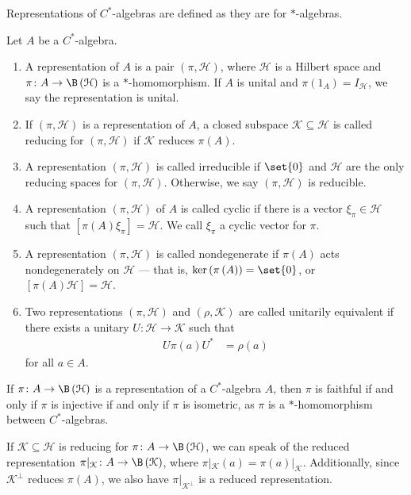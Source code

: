 \documentclass[10pt]{mypackage}
\begin{document}
Representations of $C^{\ast}$-algebras are defined as they are for $\ast$-algebras.
\begin{definition}
  Let $A$ be a $C^{\ast}$-algebra.
  \begin{enumerate}[(1)]
    \item A representation of $A$ is a pair $\left(\pi,\mathcal{H}\right)$, where $\mathcal{H}$ is a Hilbert space and $\pi\colon A\rightarrow \B\left(\mathcal{H}\right)$ is a $\ast$-homomorphism. If $A$ is unital and $\pi\left(1_A\right) = I_{\mathcal{H}}$, we say the representation is unital.
    \item If $\left(\pi,\mathcal{H}\right)$ is a representation of $A$, a closed subspace $\mathcal{K}\subseteq \mathcal{H}$ is called reducing for $\left(\pi,\mathcal{H}\right)$ if $\mathcal{K}$ reduces $\pi(A)$.
    \item A representation $\left(\pi,\mathcal{H}\right)$ is called irreducible if $\set{0}$ and $\mathcal{H}$ are the only reducing spaces for $\left(\pi,\mathcal{H}\right)$. Otherwise, we say $\left(\pi,\mathcal{H}\right)$ is reducible.
    \item A representation $\left(\pi,\mathcal{H}\right)$ of $A$ is called cyclic if there is a vector $\xi_{\pi}\in \mathcal{H}$ such that $\left[\pi(A)\xi_{\pi}\right] = \mathcal{H}$. We call $\xi_{\pi}$ a cyclic vector for $\pi$.
    \item A representation $\left(\pi,\mathcal{H}\right)$ is called nondegenerate if $\pi(A)$ acts nondegenerately on $\mathcal{H}$ --- that is, $\ker\left(\pi\left(A\right)\right) = \set{0}$, or $\left[\pi(A)\mathcal{H}\right] = \mathcal{H}$.
    \item Two representations $\left(\pi,\mathcal{H}\right)$ and $\left(\rho,\mathcal{K}\right)$ are called unitarily equivalent if there exists a unitary $U\colon \mathcal{H}\rightarrow \mathcal{K}$ such that
      \begin{align*}
        U\pi(a)U^{\ast} &= \rho(a)
      \end{align*}
      for all $a\in A$.
  \end{enumerate}
\end{definition}
\begin{remark}
  If $\pi\colon A\rightarrow \B\left(\mathcal{H}\right)$ is a representation of a $C^{\ast}$-algebra $A$, then $\pi$ is faithful if and only if $\pi$ is injective if and only if $\pi$ is isometric, as $\pi$ is a $\ast$-homomorphism between $C^{\ast}$-algebras.
\end{remark}
If $\mathcal{K}\subseteq \mathcal{H}$ is reducing for $\pi\colon A\rightarrow \B\left(\mathcal{H}\right)$, we can speak of the reduced representation $\pi|_{\mathcal{K}}\colon A\rightarrow \B\left(\mathcal{K}\right)$, where $\pi|_{\mathcal{K}}(a) = \pi(a)|_{\mathcal{K}}$. Additionally, since $\mathcal{K}^{\perp}$ reduces $\pi(A)$, we also have $\pi|_{\mathcal{K}^{\perp}}$ is a reduced representation.\newline
\end{document}
